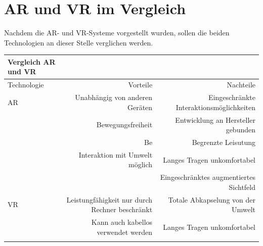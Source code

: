 \section{AR und VR im Vergleich}

Nachdem die AR- und VR-Systeme vorgestellt wurden, sollen die beiden Technologien an dieser Stelle verglichen werden.

\begin{tabular}{lrr} 
\toprule
Vergleich AR und VR\\  
\midrule 
Technologie & Vorteile & Nachteile\\ 
\midrule 
AR & Unabhängig von anderen Geräten & Eingeschränkte Interaktionsmöglichkeiten\\
   & Bewegungsfreiheit				& Entwicklung an Hersteller gebunden\\
   & Be								& Begrenzte Leisutung\\
   & Interaktion mit Umwelt möglich & Langes Tragen unkomfortabel\\
   & 								& Eingeschränktes augmentiertes Sichtfeld\\
VR & Leistungfähigkeit nur durch Rechner beschränkt  & Totale Abkapselung von der Umwelt \\
	& Kann auch kabellos verwendet werden		  	 & Langes Tragen unkomfortabel\\
	& & \\
\bottomrule
\end{tabular}







